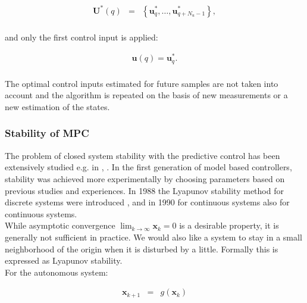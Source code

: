 		\begin{equation}
        \begin{array}{rcl}
				\textbf{U}^*(q)&=&\left\{\textbf{u}^*_q,\dots,\textbf{u}^*_{q+N_u-1}\right\},\\
        \end{array}
        \label{BASICMPC:equ:receiding_optimal_sequence}
    \end{equation}
		
		and only the first control input is applied:
		
		\begin{equation}
        \begin{array}{rcl}
				\textbf{u}(q)=\textbf{u}^*_q.\\
        \end{array}
        \label{BASICMPC:equ:receiding_optimal_first}
    \end{equation}
		
		The optimal control inputs estimated for future samples are not taken into account and the algorithm is
repeated on the basis of new measurements or a new estimation of the states.	

    \subsubsection{Stability of MPC}\label{BASICCSR:sec:MPCStability}

    	The problem of closed system stability with the predictive control has been extensively studied e.g. in \cite{mayne2000constrained}, \cite{grieder2005stabilizing}. In the first generation of model based controllers, stability was achieved more experimentally by choosing parameters based on previous studies and experiences. In 1988 the Lyapunov stability method for discrete systems were introduced \cite{keerthi1988optimal}, and in 1990 for continuous systems \cite{mayne1990receding} also for continuous systems. \\
    While asymptotic convergence $\lim_{k\rightarrow\infty}\textbf{x}_k=0$ is a desirable property, it is generally not sufficient in practice. We would also like a system to stay in a small neighborhood of the origin when it is disturbed by a little. Formally this is expressed as Lyapunov stability.\\
    For the autonomous system:

    \begin{equation}
    \begin{array}{rcl}
            \textbf{x}_{k+1}&=&g(\textbf{x}_k)\\
        \end{array}
        \label{BASICMPC:equ:autonom_system}
    \end{equation}

